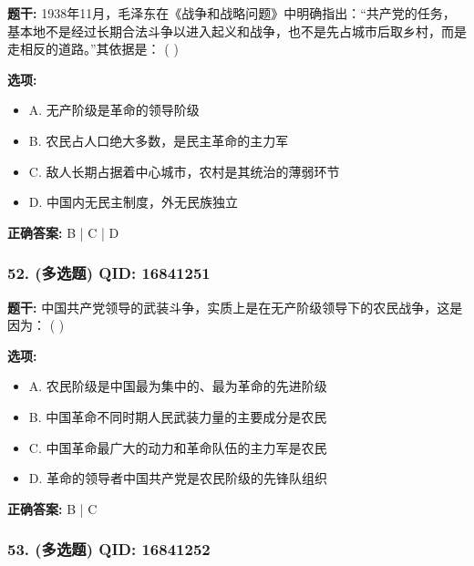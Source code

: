\documentclass[12pt,UTF8]{ctexart}
\begin{document}
\textbf{题干:}
1938年11月，毛泽东在《战争和战略问题》中明确指出：“共产党的任务，基本地不是经过长期合法斗争以进入起义和战争，也不是先占城市后取乡村，而是走相反的道路。”其依据是： ( )

\textbf{选项:}
\begin{itemize}[leftmargin=*]

  \item A. 无产阶级是革命的领导阶级

  \item B. 农民占人口绝大多数，是民主革命的主力军

  \item C. 敌人长期占据着中心城市，农村是其统治的薄弱环节

  \item D. 中国内无民主制度，外无民族独立

\end{itemize}

\textbf{正确答案:}
B | C | D

\vspace{0.3em}\hrulefill\vspace{0.7em}

\subsubsection*{52. (多选题) \small QID: 16841251}

\textbf{题干:}
中国共产党领导的武装斗争，实质上是在无产阶级领导下的农民战争，这是因为： ( )

\textbf{选项:}
\begin{itemize}[leftmargin=*]

  \item A. 农民阶级是中国最为集中的、最为革命的先进阶级

  \item B. 中国革命不同时期人民武装力量的主要成分是农民

  \item C. 中国革命最广大的动力和革命队伍的主力军是农民

  \item D. 革命的领导者中国共产党是农民阶级的先锋队组织

\end{itemize}

\textbf{正确答案:}
B | C

\vspace{0.3em}\hrulefill\vspace{0.7em}

\subsubsection*{53. (多选题) \small QID: 16841252}
\end{document}
